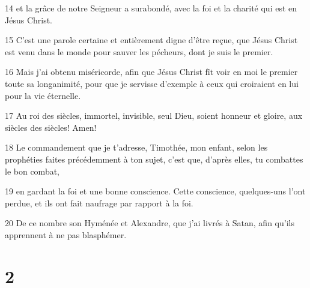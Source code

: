 \par 14 et la grâce de notre Seigneur a surabondé, avec la foi et la charité qui est en Jésus Christ.
\par 15 C'est une parole certaine et entièrement digne d'être reçue, que Jésus Christ est venu dans le monde pour sauver les pécheurs, dont je suis le premier.
\par 16 Mais j'ai obtenu miséricorde, afin que Jésus Christ fît voir en moi le premier toute sa longanimité, pour que je servisse d'exemple à ceux qui croiraient en lui pour la vie éternelle.
\par 17 Au roi des siècles, immortel, invisible, seul Dieu, soient honneur et gloire, aux siècles des siècles! Amen!
\par 18 Le commandement que je t'adresse, Timothée, mon enfant, selon les prophéties faites précédemment à ton sujet, c'est que, d'après elles, tu combattes le bon combat,
\par 19 en gardant la foi et une bonne conscience. Cette conscience, quelques-uns l'ont perdue, et ils ont fait naufrage par rapport à la foi.
\par 20 De ce nombre son Hyménée et Alexandre, que j'ai livrés à Satan, afin qu'ils apprennent à ne pas blasphémer.

\chapter{2}

